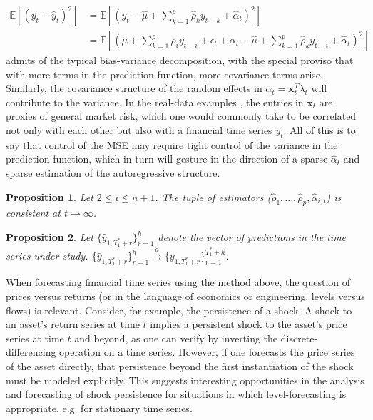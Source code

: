 \documentclass[11pt]{article}
\newcommand{\x}{\textbf{x}}
\def\E{\mathbb{E}} %
\newtheorem{prop}{Proposition}
\theoremstyle{definition}
\begin{document}
\begin{align}
  \E[(y_{t}-\hat{y}_{t})^{2}] &= \E[(y_{t} - \hat\mu + \sum^{p}_{k=1}\hat\rho_{k}y_{t-k} + \hat{\alpha}_{t})^{2}]\\
  &= \E[(\mu + \sum^{p}_{k=1}\rho_{i}y_{t-i} + \epsilon_{t} + \alpha_{t} - \hat\mu + \sum^{p}_{k=1}\hat\rho_{k}y_{t-i} + \hat{\alpha}_{t})^{2}] 
  \end{align}
admits of the typical bias-variance decomposition, with the special proviso that with more terms in the prediction function, more covariance terms arise.  Similarly, the covariance structure of the random effects in $\alpha_{t} = \x_{t}^{T}\lambda_{t}$ will contribute to the variance.  In the real-data examples \cite{lin2021minimizing}, the entries in $\x_{t}$ are proxies of general market risk, which one would commonly take to be correlated not only with each other but also with a financial time series $y_{t}$.  All of this is to say that control of the MSE may require tight control of the variance in the prediction function, which in turn will gesture in the direction of a sparse $\hat\alpha_{t}$ and sparse estimation of the autoregressive structure.

\begin{prop}\label{ARIMA_param_consistency}
Let $2\leq i \leq n+1$.  The tuple of estimators ($\hat\rho_{1},...,\hat\rho_{p}, \hat\alpha_{i,t}$) is consistent at $t \rightarrow \infty$.
\end{prop}

\begin{prop}\label{ARIMA_conv_distribution}
  Let $\{\hat y_{1,T_{1}^{*}+r}\}^{h}_{r=1}$ denote the vector of predictions in the time series under study.  $\{\hat y_{1,T_{1}^{*}+r}\}^{h}_{r=1} \xrightarrow{d} \{ y_{1,T_{1}^{*}+r}\}^{T_{1}^{*}+h}_{r=1}$.
  \end{prop}

When forecasting financial time series using the method above, the question of prices versus returns (or in the language of economics or engineering, levels versus flows) is relevant.  Consider, for example, the persistence of a shock.  A shock to an asset's return series at time $t$ implies a persistent shock to the asset's price series at time $t$ and beyond, as one can verify by inverting the discrete-differencing operation on a time series.  However, if one forecasts the price series of the asset directly, that persistence beyond the first instantiation of the shock must be modeled explicitly.  This suggests interesting opportunities in the analysis and forecasting of shock persistence for situations in which level-forecasting is appropriate, e.g. for stationary time series.
\end{document}
